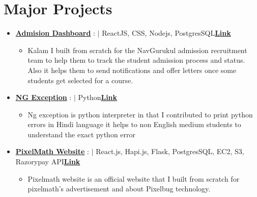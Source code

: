 \documentclass[letterpaper,11pt]{article}
\begin{document}
\section*{Major Projects}
\begin{itemize}[left=0pt,itemsep=-10pt]

 \item \textbf{\href{https://github.com/navgurukul/kalam}{Admision Dashboard}} : $|$ ReactJS, CSS, Nodejs, PostgresSQL\hfill \textbf{\href{https://admissions.navgurukul.org/}{Link}}
    \begin{itemize}[left=10pt, itemsep=-3pt]
    \vspace{-5pt}
    \item 
    Kalam I built from scratch for the NavGurukul admission recruitment team to help them to track the student admission process and status. Also it helps them to send notifications and offer letters once some students get selected for a course.
    \end{itemize}
    
\vspace{5pt} 

 \item \textbf{\href{https://github.com/pralhad88}{NG Exception}} : $|$ Python\hfill \textbf{\href{https://github.com/pralhad88/ng_exception/}{Link}}
    \begin{itemize}[left=10pt, itemsep=-3pt]
    \vspace{-5pt}
    
    \item Ng exception is python interpreter in that I contributed to print python errors in Hindi language it helps to non English medium students to understand the exact python error 
    
    \end{itemize} 
\vspace{5pt} 

 \item \textbf{\href{https://github.com/pralhad88}{PixelMath Website}} : $|$ React.js, Hapi.js, Flask, PostgresSQL, EC2, S3, Razorypay API\hfill \textbf{\href{https://github.com/pralhad88}{Link}}
    \begin{itemize}[left=10pt, itemsep=-3pt]
    \vspace{-5pt}
    
    \item Pixelmath website is an official website that I built from scratch for pixelmath’s advertisement and about Pixelbug technology.
    \end{itemize}
\vspace{5pt} 


\end{itemize}
\end{document}
